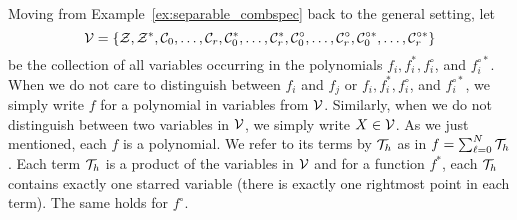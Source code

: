 \documentclass[12pt, a4paper, twoside]{report}
\begin{document}
Moving from Example~\ref{ex:separable_combspec} back to the general setting, let
$$\mathcal{V} = \{\mathcal{Z},\mathcal{Z}^*,\mathcal{C}_0,\ldots,\mathcal{C}_r,\mathcal{C}^*_0,\ldots,\mathcal{C}_r^*, \mathcal{C}^\circ_0,\ldots,\mathcal{C}_r^\circ, \mathcal{C}^{\circ*}_0,\ldots,\mathcal{C}_r^{\circ*}\}$$
be the collection of all variables occurring in the polynomials $f_i,f_i^*,f_i^\circ$, and $f_i^{\circ*}$. When we do not care to distinguish between $f_i$ and $f_j$ or $f_i, f_i^*, f_i^\circ$, and $f_i^{\circ*}$, we simply write $f$ for a polynomial in variables from $\mathcal{V}$. Similarly, when we do not distinguish between two variables in $\mathcal{V}$, we simply write $X \in \mathcal{V}$. As we just mentioned, each $f$ is a polynomial. We refer to its terms by $\mathcal{T}_h$ as in $f = \sum_{\ell=0}^N\mathcal{T}_h$. Each term $\mathcal{T}_h$ is a product of the variables in $\mathcal{V}$ and for a function $f^*$, each $\mathcal{T}_h$ contains exactly one starred variable (there is exactly one rightmost point in each term). The same holds for $f^\circ$. 
\end{document}
